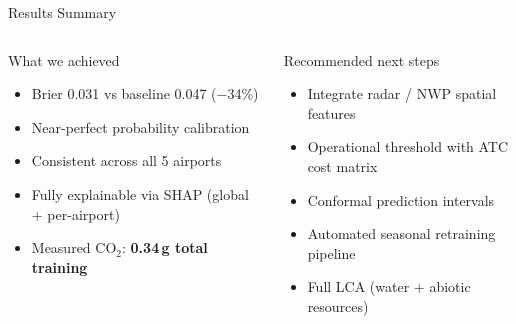 \documentclass[aspectratio=169,10pt]{beamer}
\begin{document}
\begin{frame}{Results Summary}
  \begin{center}
  \end{center}
  \vspace{4pt}
  \begin{columns}[T]
      \begin{exampleblock}{What we achieved}
        \begin{itemize}
          \item Brier 0.031 vs baseline 0.047 ($-$34\%)
          \item Near-perfect probability calibration
          \item Consistent across all 5 airports
          \item Fully explainable via SHAP (global + per-airport)
          \item Measured CO$_2$: \textbf{0.34\,g total training}
        \end{itemize}
      \end{exampleblock}
      \begin{block}{Recommended next steps}
        \begin{itemize}
          \item Integrate radar / NWP spatial features
          \item Operational threshold with ATC cost matrix
          \item Conformal prediction intervals
          \item Automated seasonal retraining pipeline
          \item Full LCA (water + abiotic resources)
        \end{itemize}
      \end{block}
  \end{columns}
\end{frame}
\end{document}
